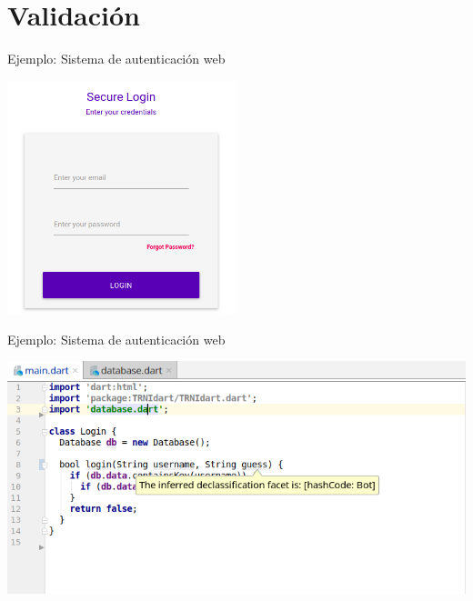 \documentclass[aspectratio=169,18pt]{beamer}
\begin{document}
\section{Validación}

\begin{frame}[fragile]{Ejemplo: Sistema de autenticación web}
	\begin{center}
		\includegraphics[width=0.5\textwidth]{images/screen4.png}
	\end{center}
\end{frame}
%
%

\begin{frame}[fragile]{Ejemplo: Sistema de autenticación web}
	\begin{center}
		\includegraphics[width=1.0\textwidth]{images/login2.png}
	\end{center}
\end{frame}
\end{document}

